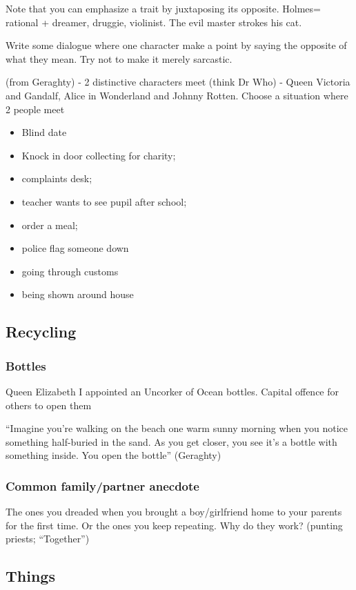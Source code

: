 \documentclass[11pt]{article}
\begin{document}
Note that you can emphasize a trait by juxtaposing its opposite. Holmes= rational + dreamer, druggie, violinist. The evil master strokes his cat.

Write some dialogue where one character make a point by saying the opposite of what they mean. Try not to make it merely sarcastic.


(from Geraghty) -  2 distinctive characters meet (think Dr Who) - Queen Victoria and Gandalf, Alice in Wonderland and Johnny Rotten. Choose a situation where 2 people meet


\begin{itemize}
\item Blind date
\item Knock in door collecting for charity;
\item complaints desk;
\item teacher wants to see pupil after school;
\item order a meal;
\item police flag someone down
\item going through customs
\item being shown around house
\end{itemize}

\subsection*{Recycling}

\subsubsection*{Bottles}
Queen Elizabeth I appointed an Uncorker of Ocean bottles. Capital offence for others to open them

``Imagine you're walking on the beach one warm sunny morning when you notice something half-buried in the sand. As you get closer, you see it's a bottle with something inside. You open the bottle'' (Geraghty)


\subsubsection*{Common family/partner anecdote}
The ones you dreaded when you brought a boy/girlfriend home to your parents for the first time. Or the ones you keep repeating. Why do they work? (punting priests; ``Together'')



\subsection*{Things}
\end{document}
